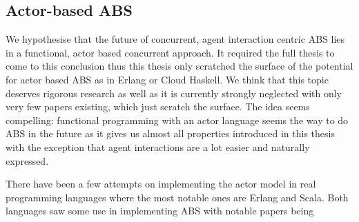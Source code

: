 

\subsection{Actor-based ABS}
We hypothesise that the future of concurrent, agent interaction centric ABS lies in a functional, actor based concurrent approach. It required the full thesis to come to this conclusion thus this thesis only scratched the surface of the potential for actor based ABS as in Erlang or Cloud Haskell. We think that this topic deserves rigorous research as well as it is currently strongly neglected with only very few papers existing, which just scratch the surface. The idea seems compelling: functional programming with an actor language seems the way to do ABS in the future as it gives us almost all properties introduced in this thesis with the exception that agent interactions are a lot easier and naturally expressed.

There have been a few attempts on implementing the actor model in real programming languages where the most notable ones are Erlang and Scala. Both languages saw some use in implementing ABS with notable papers being \cite{bezirgiannis_improving_2013,di_stefano_using_2005, di_stefano_exat:_2007, varela_modelling_2004, sher_agent-based_2013}



